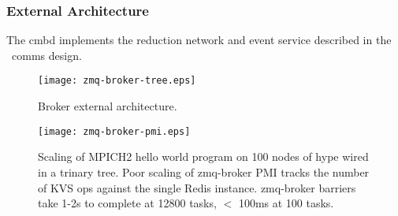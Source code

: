 \subsubsection {External Architecture}
The cmbd implements the reduction network and event service described
in the \ngrm\ comms design.

\begin{figure}
\centering
\texttt{[image: zmq-broker-tree.eps]}
\caption{Broker external architecture.}
\label{fig:cmbext}
\end{figure}

\begin{figure}
\centering
\texttt{[image: zmq-broker-pmi.eps]}
\caption{Scaling of MPICH2 hello world program on 100 nodes of hype wired
in a trinary tree.  Poor scaling of zmq-broker PMI tracks the number of
KVS ops against the single Redis instance.  zmq-broker barriers take 1-2s
to complete at 12800 tasks, $<$ 100ms at 100 tasks.}
\label{fig:cmbext}
\end{figure}


